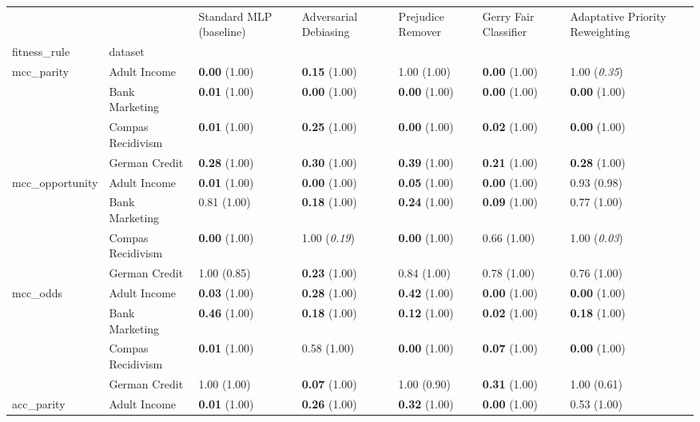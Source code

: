 \begin{tabular}{lllllll}
\toprule
 &  & Standard MLP (baseline) & Adversarial Debiasing & Prejudice Remover & Gerry Fair Classifier & Adaptative Priority Reweighting \\
fitness_rule & dataset &  &  &  &  &  \\
\midrule
\multirow[t]{4}{*}{mcc_parity} & Adult Income & \textbf{0.00} (1.00) & \textbf{0.15} (1.00) & 1.00 (1.00) & \textbf{0.00} (1.00) & 1.00 (\textit{0.35}) \\
 & Bank Marketing & \textbf{0.01} (1.00) & \textbf{0.00} (1.00) & \textbf{0.00} (1.00) & \textbf{0.00} (1.00) & \textbf{0.00} (1.00) \\
 & Compas Recidivism & \textbf{0.01} (1.00) & \textbf{0.25} (1.00) & \textbf{0.00} (1.00) & \textbf{0.02} (1.00) & \textbf{0.00} (1.00) \\
 & German Credit & \textbf{0.28} (1.00) & \textbf{0.30} (1.00) & \textbf{0.39} (1.00) & \textbf{0.21} (1.00) & \textbf{0.28} (1.00) \\
\cline{1-7}
\multirow[t]{4}{*}{mcc_opportunity} & Adult Income & \textbf{0.01} (1.00) & \textbf{0.00} (1.00) & \textbf{0.05} (1.00) & \textbf{0.00} (1.00) & 0.93 (0.98) \\
 & Bank Marketing & 0.81 (1.00) & \textbf{0.18} (1.00) & \textbf{0.24} (1.00) & \textbf{0.09} (1.00) & 0.77 (1.00) \\
 & Compas Recidivism & \textbf{0.00} (1.00) & 1.00 (\textit{0.19}) & \textbf{0.00} (1.00) & 0.66 (1.00) & 1.00 (\textit{0.03}) \\
 & German Credit & 1.00 (0.85) & \textbf{0.23} (1.00) & 0.84 (1.00) & 0.78 (1.00) & 0.76 (1.00) \\
\cline{1-7}
\multirow[t]{4}{*}{mcc_odds} & Adult Income & \textbf{0.03} (1.00) & \textbf{0.28} (1.00) & \textbf{0.42} (1.00) & \textbf{0.00} (1.00) & \textbf{0.00} (1.00) \\
 & Bank Marketing & \textbf{0.46} (1.00) & \textbf{0.18} (1.00) & \textbf{0.12} (1.00) & \textbf{0.02} (1.00) & \textbf{0.18} (1.00) \\
 & Compas Recidivism & \textbf{0.01} (1.00) & 0.58 (1.00) & \textbf{0.00} (1.00) & \textbf{0.07} (1.00) & \textbf{0.00} (1.00) \\
 & German Credit & 1.00 (1.00) & \textbf{0.07} (1.00) & 1.00 (0.90) & \textbf{0.31} (1.00) & 1.00 (0.61) \\
\cline{1-7}
\multirow[t]{4}{*}{acc_parity} & Adult Income & \textbf{0.01} (1.00) & \textbf{0.26} (1.00) & \textbf{0.32} (1.00) & \textbf{0.00} (1.00) & 0.53 (1.00) \\

\end{tabular}
